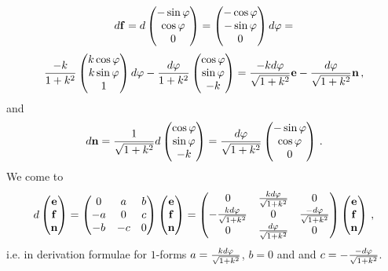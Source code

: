 \documentclass[12pt]{article}
\theoremstyle{theorem}
\numberwithin{equation}{section}
\begin{document}
{           $$
   d{\bf f}=d\begin{pmatrix}
        -\sin\varphi\cr
        \cos\varphi\cr
          0\cr
   \end{pmatrix}=
     \begin{pmatrix}
        -\cos\varphi\cr
        -\sin\varphi\cr
          0\cr
   \end{pmatrix}d\varphi=
        $$
        $$
   {-k\over 1+k^2}\begin{pmatrix}
        k\cos\varphi\cr
        k\sin\varphi\cr
        1\cr
   \end{pmatrix}d\varphi-{d\varphi\over 1+k^2}
             \begin{pmatrix}
        \cos \varphi\cr
        \sin\varphi\cr
        -k\cr
   \end{pmatrix}={-kd\varphi\over \sqrt{1+k^2}}{\bf e}-{d\varphi\over \sqrt {1+k^2}}{\bf n}\,,
     $$
and
       $$
   d{\bf n}={1\over \sqrt {1+k^2}}d\begin{pmatrix}
        \cos \varphi\cr
        \sin\varphi\cr
        -k\cr
   \end{pmatrix}=
   {d\varphi\over \sqrt {1+k^2}}
   \begin{pmatrix}
        -\sin \varphi\cr
        \cos\varphi\cr
        0\cr
   \end{pmatrix}\,.
       $$
We come to
   \begin{equation}\label{derivationformulaefor cone}
                    d\begin{pmatrix}
                    {\bf e}\cr{\bf f}\cr{\bf n}\cr
                    \end{pmatrix}=
                    \begin{pmatrix}
                    0&a&b\cr -a&0&c\cr -b&-c&0\cr
                    \end{pmatrix}
                 \begin{pmatrix}
                    {\bf e}\cr{\bf f}\cr{\bf n}\cr
                    \end{pmatrix}=
                     \begin{pmatrix}
                    0&{kd\varphi\over \sqrt {1+k^2}}&0\cr
                     -{kd\varphi\over \sqrt {1+k^2}}&0&{-d\varphi\over \sqrt {1+k^2}}\cr
                      0&{d\varphi\over \sqrt {1+k^2}}&0\cr
                    \end{pmatrix}
                 \begin{pmatrix}
                    {\bf e}\cr{\bf f}\cr{\bf n}\cr
                    \end{pmatrix}\,,
                   \end{equation}
  i.e. in derivation formulae for $1$-forms $a={kd\varphi\over \sqrt {1+k^2}}$, $b=0$ and
  and $c=-{-d\varphi\over \sqrt {1+k^2}}$.

}
\end{document}
